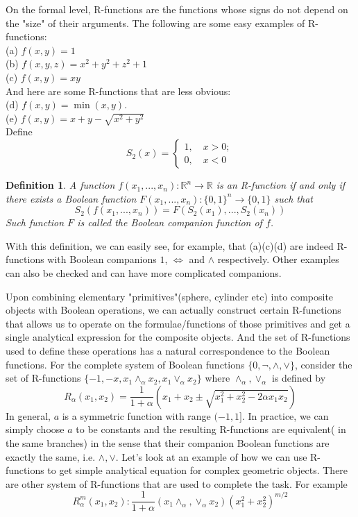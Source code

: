 \documentclass[12pt]{amsart}
\newtheorem{definition}{Definition}%
\begin{document}
On the formal level, R-functions are the functions whose signs do not depend on the "size" of their arguments.  The following are some easy  examples of R-functions: \\
(a) $f(x,y)=1$\\
(b) $f(x,y,z)=x^2+y^2+z^2+1$\\
(c) $f(x,y)=xy$\\
And here are some R-functions that are less obvious:\\
(d) $f(x,y)=\min(x,y)$. \\
(e) $f(x,y)=x+y-\sqrt{x^2+y^2}$\\
Define 
$$S_2(x)=\begin{cases} 1,\quad x>0;\\ 0, \quad x<0\end{cases}$$
\begin{definition}
A function $f(x_1,...,x_n):\mathbb{R}^n\to\mathbb{R}$ is an R-function if and only if there exists a Boolean function $F(x_1,...,x_n):\{0,1\}^n\to \{0,1\}$ such that
$$S_2(f(x_1,...,x_n))=F(S_2(x_1),...,S_2(x_n))$$
Such function $F$ is called the Boolean companion function of $f$.
\end{definition}
With this definition, we can easily see, for example,   that (a)(c)(d) are indeed R-functions with Boolean companions $1$, $\Leftrightarrow$ and $\wedge$ respectively. Other examples can also be checked and can have more complicated companions. 

Upon combining elementary "primitives"(sphere, cylinder etc) into composite objects with Boolean operations, we can actually construct certain R-functions that allows us to operate on the formulae/functions of those primitives and get a single analytical expression for the composite objects. And the set of R-functions used to define these operations has a natural correspondence to the Boolean functions. For the complete system of Boolean functions $\{0, \neg, \wedge, \vee\}$, consider the set of R-functions $\{-1,-x, x_1\wedge_\alpha x_2, x_1\vee_\alpha x_2\}$ where $\wedge_\alpha, \vee_\alpha$ is defined by
$$R_\alpha(x_1,x_2)=\frac{1}{1+\alpha} (x_1+x_2\pm \sqrt{x_1^2+x_2^2-2\alpha x_1x_2})$$
In general, $a$ is a symmetric function with range $(-1,1]$. In practice, we can simply choose $a$ to be constants and the resulting R-functions are equivalent( in the same branches) in the sense that their companion Boolean functions are exactly the same, i.e. $\wedge,\vee$. Let's look at an example of how we can use R-functions to get simple analytical equation for complex geometric objects. There are other system of R-functions that are used to complete the task. For example
$$R_{\alpha}^m(x_1,x_2): \frac{1}{1+\alpha} (x_1 \wedge_\alpha ,\vee_\alpha x_2)(x_1^2+x_2^2)^{m/2}$$
\end{document}
